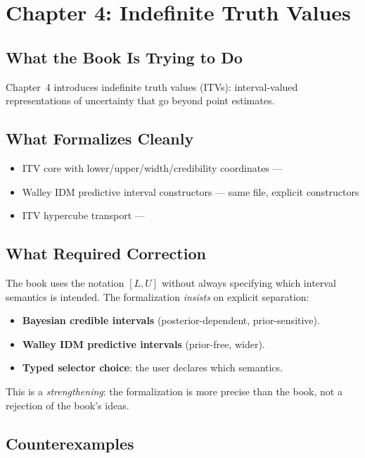 \documentclass[11pt,openany]{report}
\begin{document}
\chapter{Chapter 4: Indefinite Truth Values}
\label{ch:review-ch4}

\section{What the Book Is Trying to Do}

Chapter~4 introduces indefinite truth values (ITVs): interval-valued
representations of uncertainty that go beyond point estimates.

\section{What Formalizes Cleanly}

\begin{itemize}
\item ITV core with lower/upper/width/credibility coordinates ---
\item Walley IDM predictive interval constructors ---
  same file, explicit  constructors
\item ITV hypercube transport ---
\end{itemize}

\section{What Required Correction}

The book uses the notation $[L, U]$ without always specifying which
interval semantics is intended.  The formalization \emph{insists} on
explicit separation:

\begin{itemize}
\item \textbf{Bayesian credible intervals} (posterior-dependent, prior-sensitive).
\item \textbf{Walley IDM predictive intervals} (prior-free, wider).
\item \textbf{Typed selector choice}: the user declares which semantics.
\end{itemize}

This is a \emph{strengthening}: the formalization is more precise than
the book, not a rejection of the book's ideas.

\section{Counterexamples}
\end{document}
